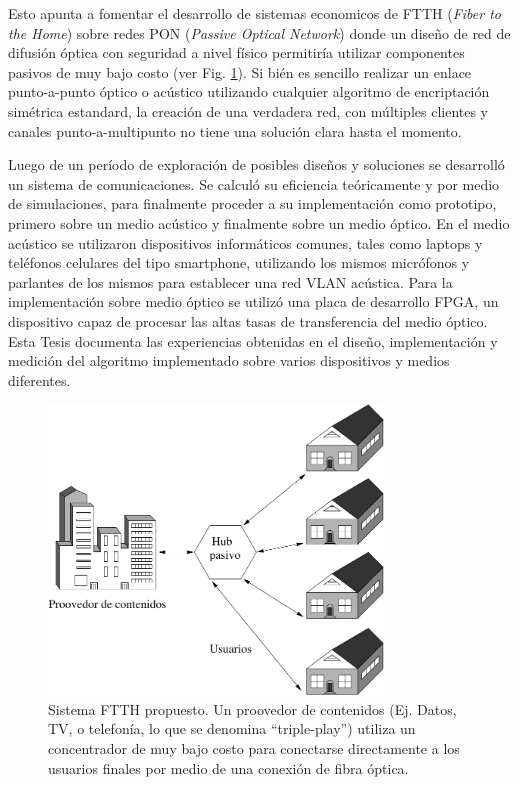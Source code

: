 Esto apunta a fomentar el desarrollo de sistemas economicos de FTTH (\textit{Fiber to the Home}) sobre redes PON (\textit{Passive Optical Network}) \cite{lee2006fiber} donde un diseño de red de difusión óptica con seguridad a nivel físico permitiría utilizar componentes pasivos de muy bajo costo (ver Fig. \ref{arch:ftth}). Si bién es sencillo realizar un enlace punto-a-punto óptico o acústico utilizando cualquier algoritmo de encriptación simétrica estandard, la creación de una verdadera red, con múltiples clientes y canales punto-a-multipunto no tiene una solución clara hasta el momento.

Luego de un período de exploración de posibles diseños y soluciones se desarrolló un sistema de comunicaciones. Se calculó su eficiencia teóricamente y por medio de simulaciones, para finalmente proceder a su implementación como prototipo, primero sobre un medio acústico y finalmente sobre un medio óptico. 
En el medio acústico se utilizaron dispositivos informáticos comunes, tales como laptops y teléfonos celulares del tipo smartphone, utilizando los mismos micrófonos y parlantes de los mismos para establecer una red VLAN acústica. 
Para la implementación sobre medio óptico se utilizó una placa de desarrollo FPGA, un dispositivo capaz de procesar las altas tasas de transferencia del medio óptico.
Esta Tesis documenta las experiencias obtenidas en el diseño, implementación y medición del algoritmo implementado sobre varios dispositivos y medios diferentes.

\begin{figure}[!t]
  \centering
    \includegraphics[width=3.5in]{graphs/ftth.pdf}
    \caption{Sistema FTTH propuesto. Un proovedor de contenidos (Ej. Datos, TV, o telefonía, lo que se denomina ``triple-play'') utiliza un concentrador de muy bajo costo para conectarse directamente a los usuarios finales por medio de una conexión de fibra óptica.}
    \label{arch:ftth}
\end{figure}

